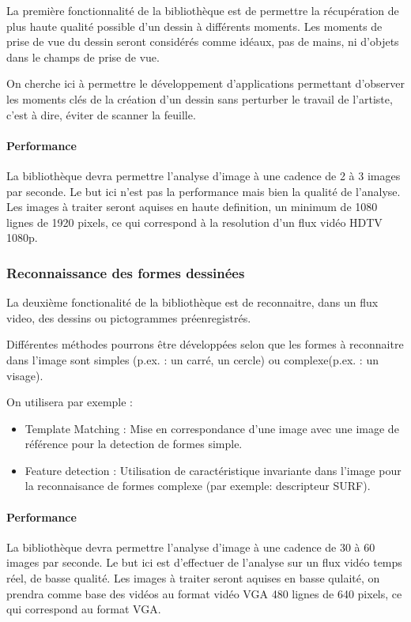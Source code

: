 La première fonctionnalité de la bibliothèque est de permettre la récupération de plus haute qualité possible d’un dessin à différents moments. Les moments de prise de vue du dessin seront considérés comme idéaux, pas de mains, ni d'objets dans le champs de prise de vue.

On cherche ici à permettre le développement d'applications permettant d'observer les moments clés de la création d'un dessin sans perturber le travail de l'artiste, c'est à dire, éviter de scanner la feuille.

\paragraph{Performance\\}
La bibliothèque devra permettre l'analyse d'image à une cadence de 2 à 3 images par seconde. Le but ici n'est pas la performance mais bien la qualité de l'analyse.
Les images à traiter seront aquises en haute definition, un minimum de 1080 lignes de 1920 pixels, ce qui correspond à la resolution d'un flux vidéo HDTV 1080p.


\subsubsection{Reconnaissance des formes dessinées\\}
La deuxième fonctionalité de la bibliothèque est de reconnaitre, dans un flux video, des dessins ou pictogrammes préenregistrés. 

Différentes méthodes pourrons être développées selon que les formes à reconnaitre dans l'image sont simples (p.ex. : un carré, un cercle) ou complexe(p.ex. : un visage).

On utilisera par exemple :

\begin{itemize}
\item Template Matching : Mise en correspondance d'une image avec une image de référence pour la detection de formes simple.
\item Feature detection : Utilisation de caractéristique invariante dans l'image pour la reconnaisance de formes complexe (par exemple: descripteur SURF).
\end{itemize}

\paragraph{Performance\\}
La bibliothèque devra permettre l'analyse d'image à une cadence de 30 à 60 images par seconde. Le but ici est d'effectuer de l'analyse sur un flux vidéo temps réel, de basse qualité.
Les images à traiter seront aquises en basse qulaité, on prendra comme base des vidéos au format vidéo VGA 480 lignes de 640 pixels, ce qui correspond au format VGA.


